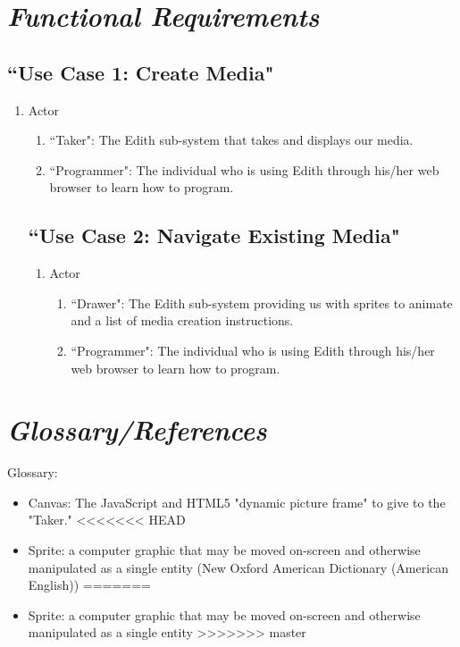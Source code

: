 \documentclass[12pt]{article}
\begin{document}
\section{\emph{Functional Requirements}}
	\subsection{``Use Case 1: Create Media"}
\begin{enumerate}
  \item Actor
  \begin{enumerate}
  		 \item ``Taker": The Edith sub-system that takes and displays our media.
       \item ``Programmer": The individual who is using Edith through his/her web browser to learn how to program.
  \end{enumerate}
  


  \subsection{``Use Case 2: Navigate Existing Media"}
\begin{enumerate}
  \item Actor
  \begin{enumerate}
      \item ``Drawer": The Edith sub-system providing us with sprites to animate and a list of media creation instructions.
      \item ``Programmer": The individual who is using Edith through his/her web browser to learn how to program.
  \end{enumerate}
  \end{enumerate}

  \end{enumerate}


\section{\emph{Glossary/References}}
Glossary:
\begin{itemize}
	\item Canvas: The JavaScript and HTML5 "dynamic picture frame" to give to the "Taker."
<<<<<<< HEAD
	\item Sprite:  a computer graphic that may be moved on-screen and otherwise manipulated as a single entity (New Oxford American Dictionary (American English))
=======
	\item Sprite:  a computer graphic that may be moved on-screen and otherwise manipulated as a single entity
>>>>>>> master
\end{itemize}
	
\end{document}
